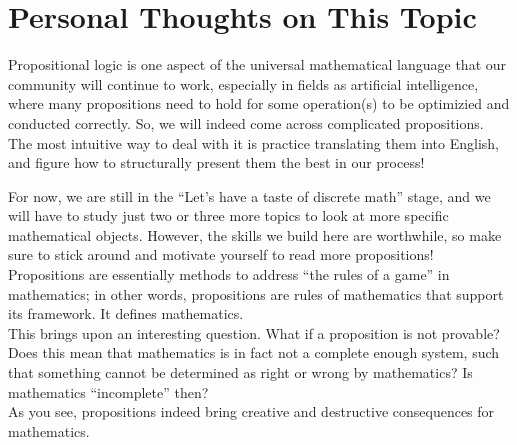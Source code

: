 \section{Personal Thoughts on This Topic}
Propositional logic is one aspect of the universal mathematical language that our community will continue to work, especially in fields as artificial intelligence, where many propositions need to hold for some operation(s) to be optimizied and conducted correctly. So, we will indeed come across complicated propositions. \\
The most intuitive way to deal with it is practice translating them into English, and figure how to structurally present them the best in our process!

For now, we are still in the ``Let's have a taste of discrete math'' stage, and we will have to study just two or three more topics to look at more specific mathematical objects. However, the skills we build here are worthwhile, so make sure to stick around and motivate yourself to read more propositions! \\
Propositions are essentially methods to address ``the rules of a game'' in mathematics; in other words, propositions are rules of mathematics that support its framework. It defines mathematics. \\
This brings upon an interesting question. What if a proposition is not provable? Does this mean that mathematics is in fact not a complete enough system, such that something cannot be determined as right or wrong by mathematics? Is mathematics ``incomplete'' then? \\

As you see, propositions indeed bring creative and destructive consequences for mathematics.
